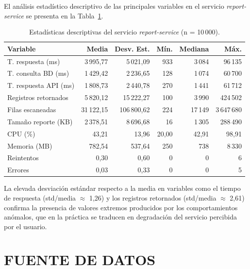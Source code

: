 \documentclass[12pt,letterpaper, oneside]{book}
\begin{document}
    El análisis estadístico descriptivo de las principales variables en el
    servicio \textit{report-service} se presenta en la
    Tabla~\ref{tab:estadisticas}.

    \begin{table}[H]
    \centering
    \begin{tabular}{lrrrrr}
    \toprule
    \textbf{Variable} & \textbf{Media} & \textbf{Desv. Est.} &
    \textbf{Mín.} & \textbf{Mediana} & \textbf{Máx.} \\
    \midrule
    T. respuesta (ms)     & 3\,995,77 & 5\,021,09 &   933 & 3\,084 &  96\,135 \\
    T. consulta BD (ms)   & 1\,429,42 & 2\,236,65 &   128 & 1\,074 &  60\,700 \\
    T. respuesta API (ms) & 1\,808,73 & 2\,440,78 &   270 & 1\,441 &  61\,712 \\
    Registros retornados  & 5\,820,12 & 15\,222,27 &  100 & 3\,990 & 424\,502 \\
    Filas escaneadas      & 31\,122,15 & 106\,800,62 & 224 & 17\,149 & 3\,647\,680 \\
    Tamaño reporte (KB)   & 2\,378,51 & 8\,696,68 &    16 & 1\,305 & 288\,490 \\
    CPU (\%)              &   43,21 &    13,96 &  20,00 &  42,91 &    98,91 \\
    Memoria (MB)          &   782,54 &   537,64 &    250 &    738 &    8\,330 \\
    Reintentos            &    0,30 &     0,60 &      0 &      0 &        6 \\
    Errores               &    0,03 &     0,33 &      0 &      0 &        5 \\
    \bottomrule
    \end{tabular}
    \caption{Estadísticas descriptivas del servicio \textit{report-service} (n = 10\,000).}
    \label{tab:estadisticas}
    \end{table}

    La elevada desviación estándar respecto a la media en variables como el
    tiempo de respuesta (std/media $\approx$ 1,26) y los registros retornados
    (std/media $\approx$ 2,61) confirma la presencia de valores extremos
    producidos por los comportamientos anómalos, que en la práctica se
    traducen en degradación del servicio percibida por el usuario.

    \section{FUENTE DE DATOS}
\end{document}
